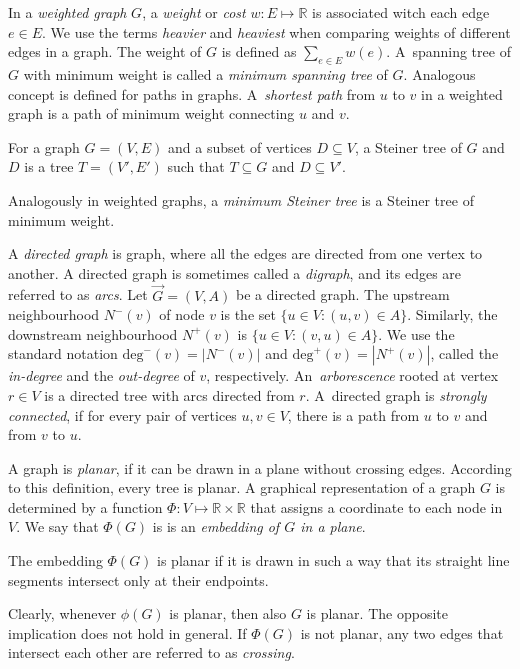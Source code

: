 In a \emph{weighted graph} $G$, a \emph{weight} or \emph{cost} $w:E\mapsto\mathbb{R}$ is associated witch each edge $e\in E$.
We use the terms \emph{heavier} and \emph{heaviest} when comparing weights of different edges in a graph.
The weight of $G$ is defined as $\sum_{e\in E}w(e)$.
A~spanning tree of $G$ with minimum weight is called a \emph{minimum spanning tree} of $G$.
Analogous concept is defined for paths in graphs.
A~\emph{shortest path} from $u$ to $v$ in a weighted graph is a path of minimum weight connecting $u$ and $v$.
\begin{definition}
	For a graph $G=(V,E)$ and a subset of vertices $D\subseteq V$, a Steiner tree of $G$ and $D$ is a tree $T=(V',E')$ such that $T\subseteq G$ and $D\subseteq V'$.
\end{definition}
Analogously in weighted graphs, a \emph{minimum Steiner tree} is a Steiner tree of minimum weight.

A \emph{directed graph} is graph, where all the edges are directed from one vertex to another. 
A directed graph is sometimes called a \emph{digraph}, and its edges are referred to as \emph{arcs}.
Let $\overrightarrow{G}=(V,A)$ be a directed graph. 
The upstream neighbourhood $N^-(v)$ of node $v$ is the set $\{u\in V: (u,v) \in A\}$. 
Similarly, the downstream neighbourhood $N^+(v)$ is $\{u\in V: (v,u) \in A\}$.
We use the standard notation $\text{deg}^-(v)=|N^-(v)|$ and $\text{deg}^+(v)=|N^+(v)|$, called the \emph{in-degree} and the \emph{out-degree} of $v$, respectively.
An~\emph{arborescence} rooted at vertex $r\in V$ is a directed tree with arcs directed from $r$.
A~directed graph is \emph{strongly connected}, if for every pair of vertices $u,v\in V$, there is a path from $u$ to $v$ and from $v$ to $u$.

A graph is \emph{planar}, if it can be drawn in a plane without crossing edges.
According to this definition, every tree is planar. 
A graphical representation of a graph $G$ is determined by a function $\Phi:V\mapsto\mathbb{R}\times\mathbb{R}$ that assigns a coordinate to each node in $V$. 
We say that $\Phi(G)$ is is an \emph{embedding of $G$ in a plane}.
\begin{definition}\label{def:planemb}
The embedding $\Phi(G)$ is planar if it is drawn in such a way that its straight line segments intersect only at their endpoints.
\end{definition}
Clearly, whenever $\phi(G)$ is planar, then also $G$ is planar. 
The opposite implication does not hold in general. 
If $\Phi(G)$ is not planar, any two edges that intersect each other are referred to as \emph{crossing}.

